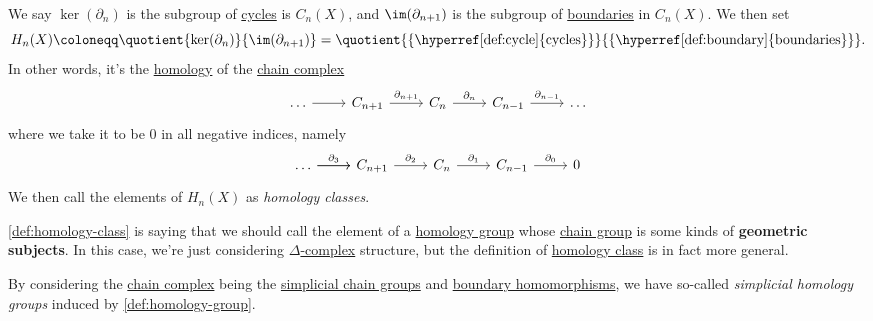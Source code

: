 \begin{definition}\label{def:homology-class}
	We say \(\ker  (\partial _{n} )\) is the subgroup of \hyperref[def:cycle]{cycles} is \(C_{n} (X)\), and \(\im (\partial_{n+1}) \) is the subgroup of \hyperref[def:boundary]{boundaries} in \(C_{n} (X)\). We then set
	\[
		H_{n} (X)\coloneqq \quotient{\ker  (\partial _{n} )}{\im  (\partial _{n+1})} = \quotient{\{\text{\hyperref[def:cycle]{cycles}}\}}{\{\text{\hyperref[def:boundary]{boundaries}}\}}.
	\]
	In other words, it's the \hyperref[def:homology-group]{homology} of the \hyperref[def:chain-complex]{chain complex}
	\[
		\begin{tikzcd}
			\dots & {C_{n+1}} & {C_{n}} & {C_{n-1}} & \dots
			\arrow[from=1-1, to=1-2]
			\arrow["{\partial_{n+1}}", from=1-2, to=1-3]
			\arrow["{\partial_{n}}", from=1-3, to=1-4]
			\arrow["{\partial_{n-1}}", from=1-4, to=1-5]
		\end{tikzcd}
	\]
	where we take it to be \(0\) in all negative indices, namely
	\[
		\begin{tikzcd}
			\dots & {C_{n+1}} & {C_{n}} & {C_{n-1}} & 0
			\arrow[from=1-1, to=1-2]
			\arrow["{\partial_{3}}", from=1-1, to=1-2]
			\arrow["{\partial_{2}}", from=1-2, to=1-3]
			\arrow["{\partial_{1}}", from=1-3, to=1-4]
			\arrow["{\partial_{0}}", from=1-4, to=1-5]
		\end{tikzcd}
	\]
	We then call the elements of \(H_{n} (X)\) as \emph{homology classes}.
\end{definition}

\begin{remark}
	\autoref{def:homology-class} is saying that we should call the element of a \hyperref[def:homology-group]{homology group} whose \hyperref[def:chain-group]{chain group} is some kinds of \textbf{geometric subjects}. In this case, we're just considering \hyperref[def:delta-complex]{\(\Delta \)-complex} structure, but the definition of \hyperref[def:homology-class]{homology class} is in fact more general.
\end{remark}

\begin{definition}\label{def:simplicial-homology-group}
	By considering the \hyperref[def:chain-complex]{chain complex} being the \hyperref[def:simplicial-chain-group]{simplicial chain groups} and \hyperref[def:boundary-homomorphism]{boundary homomorphisms}, we have so-called \emph{simplicial homology groups} induced by \autoref{def:homology-group}.
\end{definition}